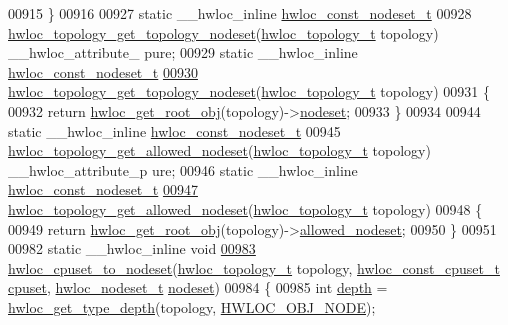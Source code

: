 \begin{DoxyCode}
00915 \}
00916 
00927 \textcolor{keyword}{static} \_\_hwloc\_inline \hyperlink{a00040_ga2f5276235841ad66a79bedad16a5a10c}{hwloc_const_nodeset_t}
00928 \hyperlink{a00061_ga78f80a3c04718ca273791a1071512031}{hwloc_topology_get_topology_nodeset}(\hyperlink{a00039_ga9d1e76ee15a7dee158b786c30b6a6e38}{hwloc_topology_t} topology) \_\_hwloc\_attribute\_
      pure;
00929 \textcolor{keyword}{static} \_\_hwloc\_inline \hyperlink{a00040_ga2f5276235841ad66a79bedad16a5a10c}{hwloc_const_nodeset_t}
\hypertarget{a00031_source_l00930}{}\hyperlink{a00061_ga78f80a3c04718ca273791a1071512031}{00930} \hyperlink{a00061_ga78f80a3c04718ca273791a1071512031}{hwloc_topology_get_topology_nodeset}(\hyperlink{a00039_ga9d1e76ee15a7dee158b786c30b6a6e38}{hwloc_topology_t} topology)
00931 \{
00932   \textcolor{keywordflow}{return} \hyperlink{a00053_gadbf58f6e187efbdb3cd9a8e30311b7d7}{hwloc_get_root_obj}(topology)->\hyperlink{a00016_a08f0d0e16c619a6e653526cbee4ffea3}{nodeset};
00933 \}
00934 
00944 \textcolor{keyword}{static} \_\_hwloc\_inline \hyperlink{a00040_ga2f5276235841ad66a79bedad16a5a10c}{hwloc_const_nodeset_t}
00945 \hyperlink{a00061_ga13915b8e074f59fbdf8f973739509293}{hwloc_topology_get_allowed_nodeset}(\hyperlink{a00039_ga9d1e76ee15a7dee158b786c30b6a6e38}{hwloc_topology_t} topology) \_\_hwloc\_attribute\_p
      ure;
00946 \textcolor{keyword}{static} \_\_hwloc\_inline \hyperlink{a00040_ga2f5276235841ad66a79bedad16a5a10c}{hwloc_const_nodeset_t}
\hypertarget{a00031_source_l00947}{}\hyperlink{a00061_ga13915b8e074f59fbdf8f973739509293}{00947} \hyperlink{a00061_ga13915b8e074f59fbdf8f973739509293}{hwloc_topology_get_allowed_nodeset}(\hyperlink{a00039_ga9d1e76ee15a7dee158b786c30b6a6e38}{hwloc_topology_t} topology)
00948 \{
00949   \textcolor{keywordflow}{return} \hyperlink{a00053_gadbf58f6e187efbdb3cd9a8e30311b7d7}{hwloc_get_root_obj}(topology)->\hyperlink{a00016_a19e3d0a5951a7510fc4fc4722a9bf531}{allowed_nodeset};
00950 \}
00951 
00982 \textcolor{keyword}{static} \_\_hwloc\_inline \textcolor{keywordtype}{void}
\hypertarget{a00031_source_l00983}{}\hyperlink{a00062_ga60ecc4ae480c28b5fbd34aca4fc37daa}{00983} \hyperlink{a00062_ga60ecc4ae480c28b5fbd34aca4fc37daa}{hwloc_cpuset_to_nodeset}(\hyperlink{a00039_ga9d1e76ee15a7dee158b786c30b6a6e38}{hwloc_topology_t} topology, \hyperlink{a00040_ga1f784433e9b606261f62d1134f6a3b25}{hwloc_const_cpuset_t} \hyperlink{a00016_a67925e0f2c47f50408fbdb9bddd0790f}{cpuset}, 
      \hyperlink{a00040_ga37e35730fa7e775b5bb0afe893d6d508}{hwloc_nodeset_t} \hyperlink{a00016_a08f0d0e16c619a6e653526cbee4ffea3}{nodeset})
00984 \{
00985         \textcolor{keywordtype}{int} \hyperlink{a00016_a9d82690370275d42d652eccdea5d3ee5}{depth} = \hyperlink{a00046_gaea7c64dd59467f5201ba87712710b14d}{hwloc_get_type_depth}(topology, \hyperlink{a00041_ggacd37bb612667dc437d66bfb175a8dc55aaf0964881117bdedf1a5e9332cd120dd}{HWLOC_OBJ_NODE});

\end{DoxyCode}
